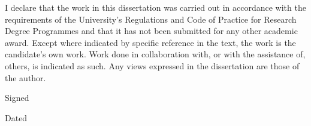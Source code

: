 \documentclass[11pt,twoside]{bristolthesis}
\begin{document}
  \begin{declaration}
    I declare that the work in this dissertation was carried out in accordance with the requirements of the University's Regulations and Code of Practice for Research Degree Programmes and that it has not been submitted for any other academic award. Except where indicated by specific reference in the text, the work is the candidate's own work. Work done in collaboration with, or with the assistance of, others, is indicated as such. Any views expressed in the dissertation are those of the author.

    \bigskip
    \bigskip
    \bigskip
    \bigskip
    \bigskip

    Signed

    \bigskip
    \bigskip
    \bigskip
    \bigskip
    \bigskip

    Dated
  \end{declaration}



  \hypersetup{linkcolor=black}
  {
  \setcounter{tocdepth}{2}
  \setcounter{secnumdepth}{2}
  \tableofcontents
  }

  \listoftables
\end{document}
